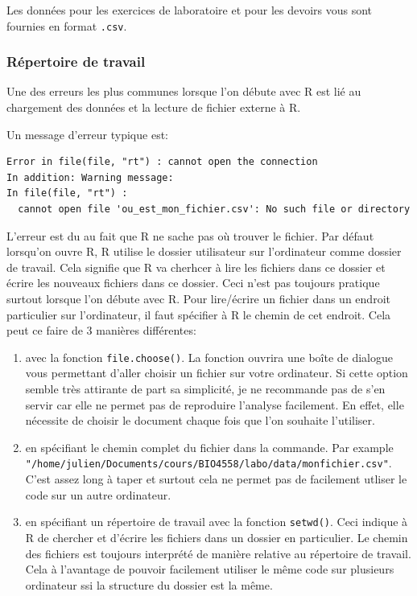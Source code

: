 \documentclass[
  12pt,
]{book}
\makeatletter
\providecommand{\tightlist}{%
  \setlength{\itemsep}{0pt}\setlength{\parskip}{0pt}}
\newenvironment{kframe}{%
\medskip{}
\setlength{\fboxsep}{.8em}
\def\at@end@of@kframe{}%
\ifinner\ifhmode%
 \def\at@end@of@kframe{\end{minipage}}%
 \begin{minipage}{\columnwidth}%
\fi\fi%
\def\FrameCommand##1{\hskip\@totalleftmargin \hskip-\fboxsep
\colorbox{incolor}{##1}\hskip-\fboxsep
    \hskip-\linewidth \hskip-\@totalleftmargin \hskip\columnwidth}%
\MakeFramed {\advance\hsize-\width
  \@totalleftmargin\z@ \linewidth\hsize
  \@setminipage}}%
{\par\unskip\endMakeFramed%
\at@end@of@kframe}
\newenvironment{rmdblock}[1]
 {
 \begin{itemize}
 \renewcommand{\labelitemi}{
   \raisebox{-.7\height}[0pt][0pt]{
     {\setkeys{Gin}{width=3em,keepaspectratio}\texttt{[image: images/\#1]}}
   }
 }
 \begin{kframe}
 \setlength{\fboxsep}{1em}
 \item
 }
 {
 \end{kframe}
 \end{itemize}
 }
\newenvironment{rmdwarning}
  {\begin{rmdblock}{warning}}
  {\end{rmdblock}}
\makeatother
\begin{document}
Les données pour les exercices de laboratoire et pour les devoirs vous sont fournies en format \texttt{.csv}.

\hypertarget{ruxe9pertoire-de-travail}{%
\subsubsection{Répertoire de travail}\label{ruxe9pertoire-de-travail}}

\begin{rmdwarning}
Une des erreurs les plus communes lorsque l'on débute avec R est lié au chargement des données et la lecture de fichier externe à R.
\end{rmdwarning}
Un message d'erreur typique est:

\begin{verbatim}
Error in file(file, "rt") : cannot open the connection
In addition: Warning message:
In file(file, "rt") :
  cannot open file 'ou_est_mon_fichier.csv': No such file or directory
\end{verbatim}

L'erreur est du au fait que R ne sache pas où trouver le fichier. Par défaut lorsqu'on ouvre R, R utilise le dossier utilisateur sur l'ordinateur comme dossier de travail. Cela signifie que R va cherhcer à lire les fichiers dans ce dossier et écrire les nouveaux fichiers dans ce dossier. Ceci n'est pas toujours pratique surtout lorsque l'on débute avec R.
Pour lire/écrire un fichier dans un endroit particulier sur l'ordinateur, il faut spécifier à R le chemin de cet endroit. Cela peut ce faire de 3 manières différentes:

\begin{enumerate}
\def\labelenumi{\arabic{enumi}.}
\tightlist
\item
  avec la fonction \texttt{file.choose()}. La fonction ouvrira une boîte de dialogue vous permettant d'aller choisir un fichier sur votre ordinateur. Si cette option semble très attirante de part sa simplicité, je ne recommande pas de s'en servir car elle ne permet pas de reproduire l'analyse facilement. En effet, elle nécessite de choisir le document chaque fois que l'on souhaite l'utiliser.
\item
  en spécifiant le chemin complet du fichier dans la commande. Par example \texttt{"/home/julien/Documents/cours/BIO4558/labo/data/monfichier.csv"}. C'est assez long à taper et surtout cela ne permet pas de facilement utliser le code sur un autre ordinateur.
\item
  en spécifiant un répertoire de travail avec la fonction \texttt{setwd()}. Ceci indique à R de chercher et d'écrire les fichiers dans un dossier en particulier. Le chemin des fichiers est toujours interprété de manière relative au répertoire de travail. Cela à l'avantage de pouvoir facilement utiliser le même code sur plusieurs ordinateur ssi la structure du dossier est la même.
\end{enumerate}
\end{document}
